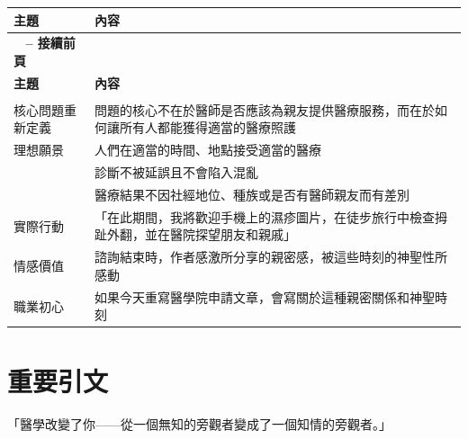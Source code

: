 \documentclass[12pt,a4paper]{article}
\newcommand{\note}[1]{
    \par
    \noindent
    \begin{tcolorbox}[
        colback=emergency_blue!5!white,
        colframe=emergency_blue,
        title=\textbf{重點提醒},
        fonttitle=\bfseries,
        boxrule=0.5pt,
        arc=3pt,
        left=6pt,
        right=6pt,
        top=6pt,
        bottom=6pt
    ]
    #1
    \end{tcolorbox}
}
\begin{document}
\begin{longtable}{>{\raggedright\arraybackslash}p{4cm} >{\raggedright\arraybackslash}p{11cm}}
\toprule
\textbf{\textcolor{emergency_red}{主題}} & \textbf{\textcolor{emergency_red}{內容}} \\
\midrule
\endfirsthead

\multicolumn{2}{c}%
{{\bfseries \tablename\ \thetable{} -- 接續前頁}} \\
\toprule
\textbf{\textcolor{emergency_red}{主題}} & \textbf{\textcolor{emergency_red}{內容}} \\
\midrule
\endhead

\midrule \multicolumn{2}{r}{{接續下頁}} \\ \midrule
\endfoot

\bottomrule
\endlastfoot

核心問題重新定義 & 問題的核心不在於醫師是否應該為親友提供醫療服務，而在於如何讓所有人都能獲得適當的醫療照護 \\

理想願景 & 人們在適當的時間、地點接受適當的醫療 \\
& 診斷不被延誤且不會陷入混亂 \\
& 醫療結果不因社經地位、種族或是否有醫師親友而有差別 \\

實際行動 & 「在此期間，我將歡迎手機上的濕疹圖片，在徒步旅行中檢查拇趾外翻，並在醫院探望朋友和親戚」 \\

情感價值 & 諮詢結束時，作者感激所分享的親密感，被這些時刻的神聖性所感動 \\

職業初心 & 如果今天重寫醫學院申請文章，會寫關於這種親密關係和神聖時刻 \\
\end{longtable}

\section{重要引文}

\note{「醫學改變了你——從一個無知的旁觀者變成了一個知情的旁觀者。」}
\end{document}
